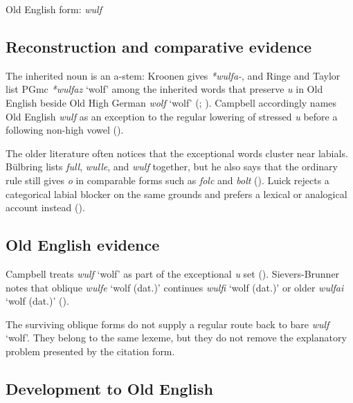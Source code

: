 \documentclass[
  british,
  a4paper,
  openany]{book}
\providecommand{\Recon}[1]{\emph{*#1}}
{\catcode`→=\active \global\def→{\ensuremath{\rightarrow}}}
\providecommand{\Recon}[1]{\emph{*#1}}
{\catcode`→=\active \global\def→{\ensuremath{\rightarrow}}}
\begin{document}
Old English form: \emph{wulf}

\subsection{Reconstruction and comparative
evidence}\label{reconstruction-and-comparative-evidence-145}

The inherited noun is an a-stem: Kroonen gives \emph{*wulfa-}, and Ringe
and Taylor list PGmc \Recon{wulfaz} `wolf' among the inherited words
that preserve \emph{u} in Old English beside Old High German \emph{wolf}
`wolf' (;
). Campbell
accordingly names Old English \emph{wulf} as an exception to the regular
lowering of stressed \emph{u} before a following non-high vowel
().

The older literature often notices that the exceptional words cluster
near labials. Bülbring lists \emph{full}, \emph{wulle}, and \emph{wulf}
together, but he also says that the ordinary rule still gives \emph{o}
in comparable forms such as \emph{folc} and \emph{bolt}
(). Luick rejects a
categorical labial blocker on the same grounds and prefers a lexical or
analogical account instead ().

\subsection{Old English evidence}\label{old-english-evidence-145}

Campbell treats \emph{wulf} `wolf' as part of the exceptional \emph{u}
set ().
Sievers-Brunner notes that oblique {\emph{wulfe}} `wolf (dat.)'
continues {\emph{wulfi}} `wolf (dat.)' or older {\emph{wulfai}} `wolf
(dat.)' ().

The surviving oblique forms do not supply a regular route back to bare
\emph{wulf} `wolf'. They belong to the same lexeme, but they do not
remove the explanatory problem presented by the citation form.

\subsection{Development to Old
English}\label{development-to-old-english-145}
\end{document}
